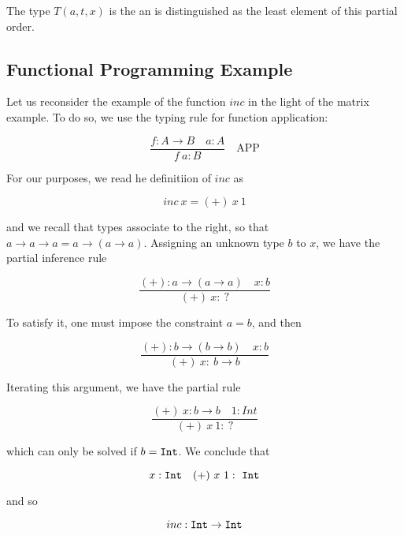 The type $T(a,t,x)$ is the  an is distinguished as the least element of this partial order.

\subsection{Functional Programming Example}

Let us reconsider the example of the function $inc$ in the light of the matrix example.  To do so, we use the typing rule for function application:

\begin{equation}
\frac{f : A \to B \quad a: A}{f\ a : B} \quad \text{APP}
\end{equation}

For our purposes, we read he definitiion of $inc$ as 

\begin{equation}
inc\ x = (+)\ x\ 1
\end{equation}

and we recall that types associate to the right, so that $a \to a \to a = a \to (a \to a)$.  Assigning an unknown type $b$ to $x$, we have the partial inference rule

\begin{equation}
\frac{(+): a \to (a \to a) \quad x: b}{(+)\ x :\ ?}
\end{equation}

To satisfy it, one must impose the constraint $a = b$, and then 

\begin{equation}
\frac{(+): b \to (b \to b) \quad x: b}{(+)\ x :\ b \to b}
\end{equation}

Iterating this argument, we have the partial rule

\begin{equation}
\frac{(+)\ x: b \to b \quad 1: Int}{(+)\ x\ 1 :\ ?}
\end{equation}

which can only be solved if $b = {\tt Int}$.  We conclude that 

\begin{equation}
x : {\tt Int} \quad (+)\ x\ 1:\ {\tt Int}
\end{equation}

and so

\begin{equation}
inc : {\tt Int} \to {\tt Int}
\end{equation}

